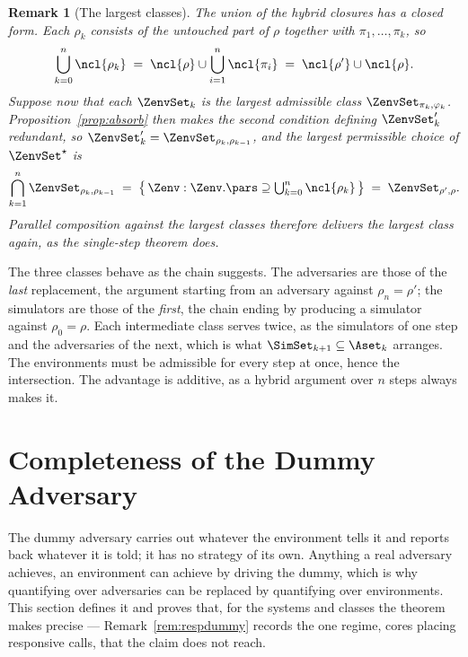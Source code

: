 \documentclass[10pt,oneside,openany]{book}
\theoremstyle{accentdef}
\newtheorem{remark}[definition]{Remark}
\theoremstyle{accentplain}
\begin{document}
\begin{remark}[The largest classes]\label{rem:parclasses}
The union of the hybrid closures has a closed form. Each $\rho_k$ consists of the
untouched part of $\rho$ together with $\pi_1,\dots,\pi_k$, so
\[
  \bigcup_{k=0}^{n} \ncl{\rho_k} \;=\; \ncl{\rho} \cup \bigcup_{i=1}^{n} \ncl{\pi_i} \;=\; \ncl{\rho'} \cup \ncl{\rho} .
\]
Suppose now that each $\ZenvSet_k$ is the largest admissible class
$\ZenvSet_{\pi_k,\varphi_k}$. Proposition~\ref{prop:absorb} then makes the second condition
defining $\ZenvSet_k'$ redundant, so $\ZenvSet_k' = \ZenvSet_{\rho_k,\rho_{k-1}}$, and the
largest permissible choice of $\ZenvSet^{\star}$ is
\[
  \bigcap_{k=1}^{n} \ZenvSet_{\rho_k,\rho_{k-1}}
  \;=\; \bigl\{\, \Zenv : \Zenv.\pars \supseteq \textstyle\bigcup_{k=0}^{n} \ncl{\rho_k} \,\bigr\}
  \;=\; \ZenvSet_{\rho',\rho} .
\]
Parallel composition against the largest classes therefore delivers the largest class again, as
the single-step theorem does.
\end{remark}

The three classes behave as the chain suggests. The adversaries are those of the \emph{last}
replacement, the argument starting from an adversary against $\rho_n = \rho'$; the simulators are
those of the \emph{first}, the chain ending by producing a simulator against $\rho_0 = \rho$. Each
intermediate class serves twice, as the simulators of one step and the adversaries of the next,
which is what $\SimSet_{k+1} \subseteq \Aset_k$ arranges. The environments must be admissible for
every step at once, hence the intersection. The advantage is additive, as a hybrid argument over
$n$ steps always makes it.

\section{Completeness of the Dummy Adversary}\label{app:dummy}

The dummy adversary carries out whatever the environment tells it and reports back whatever it is
told; it has no strategy of its own. Anything a real adversary achieves, an environment can
achieve by driving the dummy, which is why quantifying over adversaries can be replaced by
quantifying over environments. This section defines it and proves that, for the systems and
classes the theorem makes precise --- Remark~\ref{rem:respdummy} records the one regime, cores
placing responsive calls, that the claim does not reach.
\end{document}
